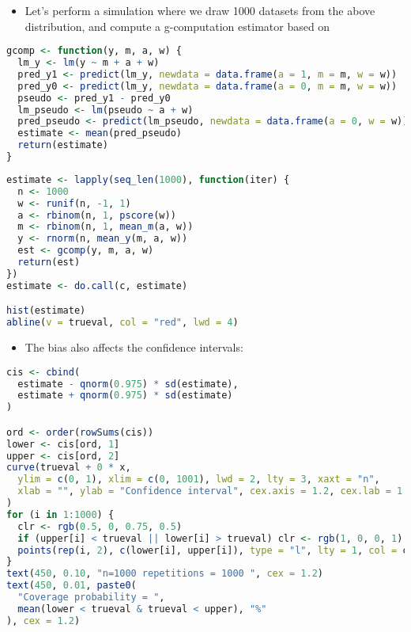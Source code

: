 \documentclass[
  12pt,
]{book}
\providecommand{\tightlist}{%
  \setlength{\itemsep}{0pt}\setlength{\parskip}{0pt}}
\theoremstyle{definition}
\theoremstyle{definition}
\theoremstyle{definition}
\newcommand{\1}{\mathbbm{1}}
\begin{document}
\begin{itemize}
\tightlist
\item
  Let's perform a simulation where we draw 1000 datasets from the above
  distribution, and compute a g-computation estimator based on
\end{itemize}

\begin{lstlisting}[language=R]
gcomp <- function(y, m, a, w) {
  lm_y <- lm(y ~ m + a + w)
  pred_y1 <- predict(lm_y, newdata = data.frame(a = 1, m = m, w = w))
  pred_y0 <- predict(lm_y, newdata = data.frame(a = 0, m = m, w = w))
  pseudo <- pred_y1 - pred_y0
  lm_pseudo <- lm(pseudo ~ a + w)
  pred_pseudo <- predict(lm_pseudo, newdata = data.frame(a = 0, w = w))
  estimate <- mean(pred_pseudo)
  return(estimate)
}
\end{lstlisting}

\begin{lstlisting}[language=R]
estimate <- lapply(seq_len(1000), function(iter) {
  n <- 1000
  w <- runif(n, -1, 1)
  a <- rbinom(n, 1, pscore(w))
  m <- rbinom(n, 1, mean_m(a, w))
  y <- rnorm(n, mean_y(m, a, w))
  est <- gcomp(y, m, a, w)
  return(est)
})
estimate <- do.call(c, estimate)

hist(estimate)
abline(v = trueval, col = "red", lwd = 4)
\end{lstlisting}

\begin{itemize}
\tightlist
\item
  The bias also affects the confidence intervals:
\end{itemize}

\begin{lstlisting}[language=R]
cis <- cbind(
  estimate - qnorm(0.975) * sd(estimate),
  estimate + qnorm(0.975) * sd(estimate)
)

ord <- order(rowSums(cis))
lower <- cis[ord, 1]
upper <- cis[ord, 2]
curve(trueval + 0 * x,
  ylim = c(0, 1), xlim = c(0, 1001), lwd = 2, lty = 3, xaxt = "n",
  xlab = "", ylab = "Confidence interval", cex.axis = 1.2, cex.lab = 1.2
)
for (i in 1:1000) {
  clr <- rgb(0.5, 0, 0.75, 0.5)
  if (upper[i] < trueval || lower[i] > trueval) clr <- rgb(1, 0, 0, 1)
  points(rep(i, 2), c(lower[i], upper[i]), type = "l", lty = 1, col = clr)
}
text(450, 0.10, "n=1000 repetitions = 1000 ", cex = 1.2)
text(450, 0.01, paste0(
  "Coverage probability = ",
  mean(lower < trueval & trueval < upper), "%"
), cex = 1.2)
\end{lstlisting}
\end{document}
